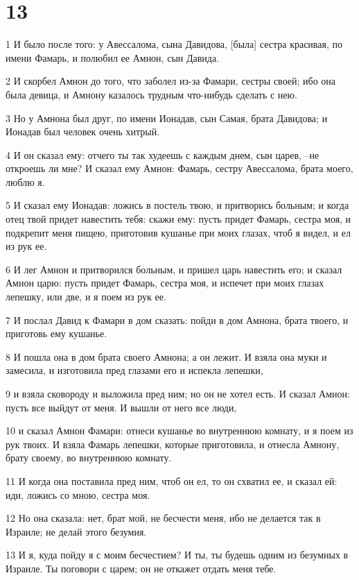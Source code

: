 \chapter{13}

\par 1 И было после того: у Авессалома, сына Давидова, [была] сестра красивая, по имени Фамарь, и полюбил ее Амнон, сын Давида.
\par 2 И скорбел Амнон до того, что заболел из-за Фамари, сестры своей; ибо она была девица, и Амнону казалось трудным что-нибудь сделать с нею.
\par 3 Но у Амнона был друг, по имени Ионадав, сын Самая, брата Давидова; и Ионадав был человек очень хитрый.
\par 4 И он сказал ему: отчего ты так худеешь с каждым днем, сын царев, --не откроешь ли мне? И сказал ему Амнон: Фамарь, сестру Авессалома, брата моего, люблю я.
\par 5 И сказал ему Ионадав: ложись в постель твою, и притворись больным; и когда отец твой придет навестить тебя: скажи ему: пусть придет Фамарь, сестра моя, и подкрепит меня пищею, приготовив кушанье при моих глазах, чтоб я видел, и ел из рук ее.
\par 6 И лег Амнон и притворился больным, и пришел царь навестить его; и сказал Амнон царю: пусть придет Фамарь, сестра моя, и испечет при моих глазах лепешку, или две, и я поем из рук ее.
\par 7 И послал Давид к Фамари в дом сказать: пойди в дом Амнона, брата твоего, и приготовь ему кушанье.
\par 8 И пошла она в дом брата своего Амнона; а он лежит. И взяла она муки и замесила, и изготовила пред глазами его и испекла лепешки,
\par 9 и взяла сковороду и выложила пред ним; но он не хотел есть. И сказал Амнон: пусть все выйдут от меня. И вышли от него все люди,
\par 10 и сказал Амнон Фамари: отнеси кушанье во внутреннюю комнату, и я поем из рук твоих. И взяла Фамарь лепешки, которые приготовила, и отнесла Амнону, брату своему, во внутреннюю комнату.
\par 11 И когда она поставила пред ним, чтоб он ел, то он схватил ее, и сказал ей: иди, ложись со мною, сестра моя.
\par 12 Но она сказала: нет, брат мой, не бесчести меня, ибо не делается так в Израиле; не делай этого безумия.
\par 13 И я, куда пойду я с моим бесчестием? И ты, ты будешь одним из безумных в Израиле. Ты поговори с царем; он не откажет отдать меня тебе.
